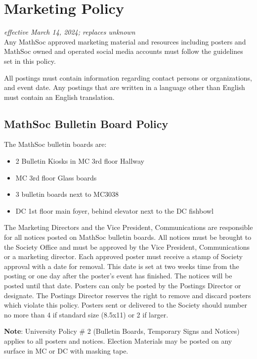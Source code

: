\section{Marketing Policy}
\emph{effective March 14, 2024; replaces unknown}\\

Any MathSoc approved marketing material and resources including posters and MathSoc owned and operated social media accounts must follow the guidelines set in this policy. 

All postings must contain information regarding contact persons or organizations, and event date.
Any postings that are written in a language other than English must contain an English translation. 

\subsection{MathSoc Bulletin Board Policy}

The MathSoc bulletin boards are: 
\begin{itemize}
    \item 2 Bulletin Kiosks in MC 3rd floor Hallway 
    \item MC 3rd floor Glass boards 
    \item 3 bulletin boards next to MC3038 
    \item DC 1st floor main foyer, behind elevator next to the DC fishbowl 
\end{itemize}

The Marketing Directors and the Vice President, Communications are responsible for all notices posted on  MathSoc bulletin boards. 
All notices must be brought to the Society Office and must be approved by the  Vice President, Communications or a marketing director. 
Each approved poster must receive a stamp of Society  approval with a date for removal. 
This date is set at two weeks time from the posting or one day after the  poster's event has finished. 
The notices will be posted until that date. 
Posters can only be posted by the  Postings Director or designate. 
The Postings Director reserves the right to remove and discard posters  which violate this policy. 
Posters sent or delivered to the Society should number no more than 4 if  standard size (8.5x11) or 2 if larger. 

\textbf{Note}: University Policy \# 2 (Bulletin Boards, Temporary Signs and Notices) applies to all posters and  notices. Election Materials may be posted on any surface in MC or DC with masking tape. 

